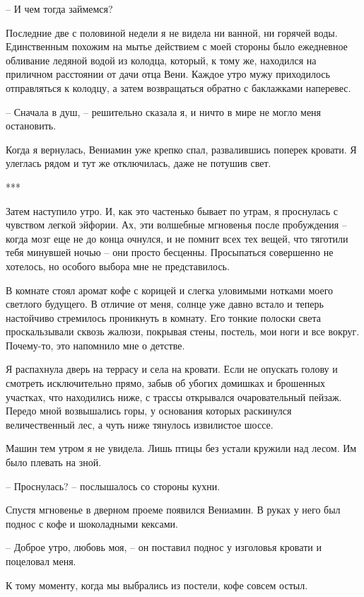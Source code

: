 \documentclass[
]{book}
\begin{document}
-- И чем тогда займемся?

Последние две с половиной недели я не видела ни ванной, ни горячей воды. Единственным похожим на мытье действием с моей стороны было ежедневное обливание ледяной водой из колодца, который, к тому же, находился на приличном расстоянии от дачи отца Вени. Каждое утро мужу приходилось отправляться к колодцу, а затем возвращаться обратно с баклажками наперевес.

-- Сначала в душ, -- решительно сказала я, и ничто в мире не могло меня остановить.

Когда я вернулась, Вениамин уже крепко спал, развалившись поперек кровати. Я улеглась рядом и тут же отключилась, даже не потушив свет.

***

Затем наступило утро. И, как это частенько бывает по утрам, я проснулась с чувством легкой эйфории. Ах, эти волшебные мгновенья после пробуждения -- когда мозг еще не до конца очнулся, и не помнит всех тех вещей, что тяготили тебя минувшей ночью -- они просто бесценны. Просыпаться совершенно не хотелось, но особого выбора мне не представилось.

В комнате стоял аромат кофе с корицей и слегка уловимыми нотками моего светлого будущего. В отличие от меня, солнце уже давно встало и теперь настойчиво стремилось проникнуть в комнату. Его тонкие полоски света проскальзывали сквозь жалюзи, покрывая стены, постель, мои ноги и все вокруг. Почему-то, это напомнило мне о детстве.

Я распахнула дверь на террасу и села на кровати. Если не опускать голову и смотреть исключительно прямо, забыв об убогих домишках и брошенных участках, что находились ниже, с трассы открывался очаровательный пейзаж. Передо мной возвышались горы, у основания которых раскинулся величественный лес, а чуть ниже тянулось извилистое шоссе.

Машин тем утром я не увидела. Лишь птицы без устали кружили над лесом. Им было плевать на зной.

-- Проснулась? -- послышалось со стороны кухни.

Спустя мгновенье в дверном проеме появился Вениамин. В руках у него был поднос с кофе и шоколадными кексами.

-- Доброе утро, любовь моя, -- он поставил поднос у изголовья кровати и поцеловал меня.

К тому моменту, когда мы выбрались из постели, кофе совсем остыл.

\hypertarget{chapter-66}{%
\chapter{~}\label{chapter-66}}
\end{document}
